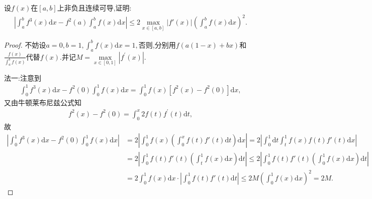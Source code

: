 \documentclass[../../main.tex]{subfiles}%
\begin{document}
\begin{example}
设$f(x)$在$[a,b]$上非负且连续可导,证明:
\begin{align*}
\left| \int_a^b f^3(x) \mathrm{d}x - f^2(a) \int_a^b f(x) \mathrm{d}x \right| \leqslant 2 \max\limits_{x\in[a,b]} |f'(x)| \left( \int_a^b f(x) \mathrm{d}x \right)^2.
\end{align*}
\end{example}
\begin{proof}

不妨设$a=0,b=1,\int_a^b{f\left( x \right)}\mathrm{d}x=1,$否则,分别用$f\left( a\left( 1-x \right) +bx \right)$和$\frac{f\left( x \right)}{\int_a^b{f\left( x \right)}}$代替$f\left( x \right).$并记$M=\max\limits_{x\in \left[ 0,1 \right]}\left| f^\prime \left( x \right) \right|.$

{\color{blue}法一:}注意到
\begin{align*}
\int_0^1{f^3\left( x \right) \mathrm{d}x}-f^2\left( 0 \right) \int_0^1{f\left( x \right) \mathrm{d}x}=\int_0^1{f\left( x \right) \left[ f^2\left( x \right) -f^2\left( 0 \right) \right] \mathrm{d}x},
\end{align*}
又由牛顿莱布尼兹公式知
\begin{align*}
f^2\left( x \right) -f^2\left( 0 \right) =\int_0^x{2f\left( t \right) f^\prime \left( t \right) \mathrm{d}t},
\end{align*}
故
\begin{align*}
\left| \int_0^1{f^3\left( x \right) \mathrm{d}x}-f^2\left( 0 \right) \int_0^1{f\left( x \right) \mathrm{d}x} \right|&=2\left| \int_0^1{f\left( x \right) \left( \int_0^x{f\left( t \right) f' \left( t \right) \mathrm{d}t} \right) \mathrm{d}x} \right|=2\left| \int_0^1{\mathrm{d}t\int_t^1{f\left( x \right) f\left( t \right) f' \left( t \right)}\mathrm{d}x} \right|
\\
&=2\left| \int_0^1{f\left( t \right) f' \left( t \right) \left( \int_t^1{f\left( x \right)}\mathrm{d}x \right) \mathrm{d}t} \right|\leqslant 2\left| \int_0^1{f\left( t \right) f' \left( t \right) \left( \int_0^1{f\left( x \right)}\mathrm{d}x \right) \mathrm{d}t} \right|
\\
&=2\int_0^1{f\left( x \right)}\mathrm{d}x\cdot \left| \int_0^1{f\left( t \right) f' \left( t \right) \mathrm{d}t} \right|\leqslant 2M\left( \int_0^1{f\left( x \right)}\mathrm{d}x \right) ^2=2M.
\end{align*}


\end{proof}
\end{document}
